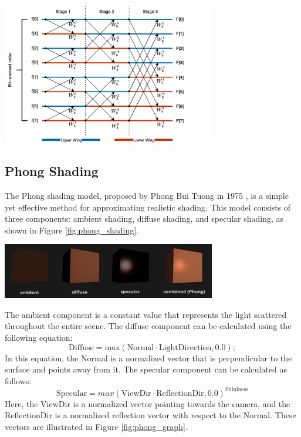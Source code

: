 \begin{minipage}{1\textwidth}
    \centering
    \includegraphics[width=0.7\textwidth]{"images/8_butterfly_diagram.png"}
    \label{fig:8_butterfly_diagram}
\end{minipage}

\subsection{Phong Shading}
The Phong shading model, proposed by Phong Bui Tuong in 1975 \cite{phong1975}, is a simple yet effective method for approximating realistic shading. This model consists of three components: ambient shading, diffuse shading, and specular shading, as shown in Figure \ref{fig:phong_shading}.

\begin{minipage}{1\textwidth}
    \centering
    \includegraphics[width=0.7\textwidth]{"images/phong_shading.png"}
    \label{fig:phong_shading}
\end{minipage}

The ambient component is a constant value that represents the light scattered throughout the entire scene. The diffuse component can be calculated using the following equation:
\begin{equation}
    \text{Diffuse} = \text{max}(\text{Normal} \cdot \text{LightDirection}, 0.0);
\end{equation}
In this equation, the Normal is a normalized vector that is perpendicular to the surface and points away from it. The specular component can be calculated as follows:
\begin{equation}
    \text{Specular} = max(\text{ViewDir} \cdot \text{ReflectionDir}, 0.0)^{\text{Shininess}}
\end{equation}
Here, the ViewDir is a normalized vector pointing towards the camera, and the ReflectionDir is a normalized reflection vector with respect to the Normal. These vectors are illustrated in Figure \ref{fig:phong_graph}.

